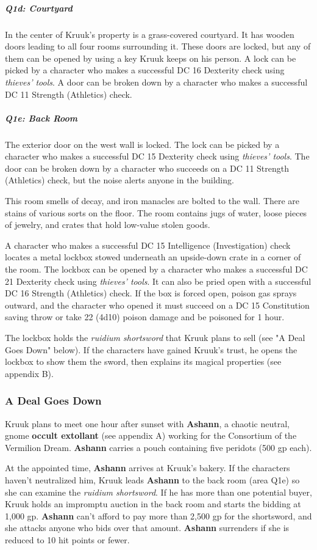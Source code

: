 \documentclass[10pt,a4paper,twoside,bg=print,twocolumn,openany,nodeprecatedcode]{dndbook}
\begin{document}
\subparagraph{Q1d: Courtyard}
In the center of Kruuk's property is a grass-covered courtyard. It has wooden doors leading to all four rooms surrounding it. These doors are locked, but any of them can be opened by using a key Kruuk keeps on his person. A lock can be picked by a character who makes a successful DC 16 Dexterity check using \textit{thieves' tools}. A door can be broken down by a character who makes a successful DC 11 Strength (Athletics) check.

\subparagraph{Q1e: Back Room}
The exterior door on the west wall is locked. The lock can be picked by a character who makes a successful DC 15 Dexterity check using \textit{thieves' tools}. The door can be broken down by a character who succeeds on a DC 11 Strength (Athletics) check, but the noise alerts anyone in the building.

This room smells of decay, and iron manacles are bolted to the wall. There are stains of various sorts on the floor. The room contains jugs of water, loose pieces of jewelry, and crates that hold low-value stolen goods.

A character who makes a successful DC 15 Intelligence (Investigation) check locates a metal lockbox stowed underneath an upside-down crate in a corner of the room. The lockbox can be opened by a character who makes a successful DC 21 Dexterity check using \textit{thieves' tools}. It can also be pried open with a successful DC 16 Strength (Athletics) check. If the box is forced open, poison gas sprays outward, and the character who opened it must succeed on a DC 15 Constitution saving throw or take 22 (4d10) poison damage and be poisoned for 1 hour.

The lockbox holds the \textit{ruidium shortsword} that Kruuk plans to sell (see "A Deal Goes Down" below). If the characters have gained Kruuk's trust, he opens the lockbox to show them the sword, then explains its magical properties (see appendix B).

\subsubsection{A Deal Goes Down}
Kruuk plans to meet one hour after sunset with \textbf{Ashann}, a chaotic neutral, gnome \textbf{occult extollant} (see appendix A) working for the Consortium of the Vermilion Dream. \textbf{Ashann} carries a pouch containing five peridots (500 gp each).

At the appointed time, \textbf{Ashann} arrives at Kruuk's bakery. If the characters haven't neutralized him, Kruuk leads \textbf{Ashann} to the back room (area Q1e) so she can examine the \textit{ruidium shortsword}. If he has more than one potential buyer, Kruuk holds an impromptu auction in the back room and starts the bidding at 1,000 gp. \textbf{Ashann} can't afford to pay more than 2,500 gp for the shortsword, and she attacks anyone who bids over that amount. \textbf{Ashann} surrenders if she is reduced to 10 hit points or fewer.
\end{document}
